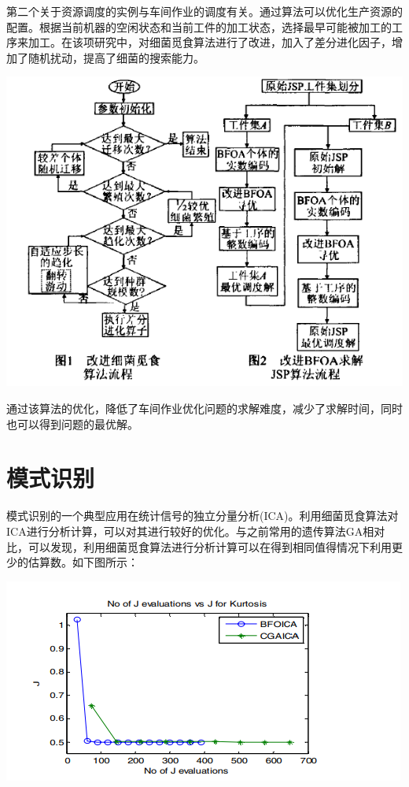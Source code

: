 \documentclass{article}
\begin{document}
第二个关于资源调度的实例与车间作业的调度有关。通过算法可以优化生产资源的配置。根据当前机器的空闲状态和当前工件的加工状态，选择最早可能被加工的工序来加工。在该项研究中，对细菌觅食算法进行了改进，加入了差分进化因子，增加了随机扰动，提高了细菌的搜索能力\cite{ref2}。
\vspace{1em}
\begin{center}
\includegraphics[scale=0.7]{flow1.png}
\end{center}
通过该算法的优化，降低了车间作业优化问题的求解难度，减少了求解时间，同时也可以得到问题的最优解。

\section{模式识别}
模式识别的一个典型应用在统计信号的独立分量分析(ICA)。利用细菌觅食算法对ICA进行分析计算，可以对其进行较好的优化。与之前常用的遗传算法GA相对比，可以发现，利用细菌觅食算法进行分析计算可以在得到相同值得情况下利用更少的估算数\cite{ref3}。如下图所示：

\begin{center}
\includegraphics[scale=1]{compare.png}
\end{center}
\end{document}
